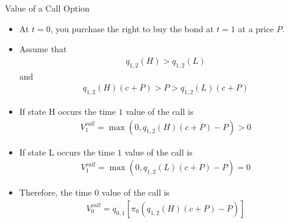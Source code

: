 \documentclass[professionalfonts,small]{beamer}
\begin{document}
\begin{frame}{Value of a Call Option}

\footnotesize
\begin{itemize}

\item At $t=0$, you purchase the right to buy the bond at $t=1$ at a price $P$.

\item Assume that
\begin{eqnarray*}
q_{1,2}(H) > q_{1,2}(L)
\end{eqnarray*}
and
\begin{eqnarray*}
q_{1,2}(H)(c+P) > P > q_{1,2}(L)(c+P)
\end{eqnarray*}

\item If state H occurs the time $1$ value of the call is
\begin{eqnarray*}
V_1^{call} = \max(0,q_{1,2}(H)(c+P) -P) > 0
\end{eqnarray*}

\item If state L occurs the time $1$ value of the call is
\begin{eqnarray*}
V_1^{call} = \max(0, q_{1,2}(L)(c+P) -P) = 0
\end{eqnarray*}

\item Therefore, the time $0$ value of the call is
\begin{eqnarray*}
V_0^{call} = q_{0,1} \left[ \pi_0(q_{1,2}(H)(c+P) -P) \right]
\end{eqnarray*}

\end{itemize}

\end{frame}

%
%
%

%
%
\end{document}

